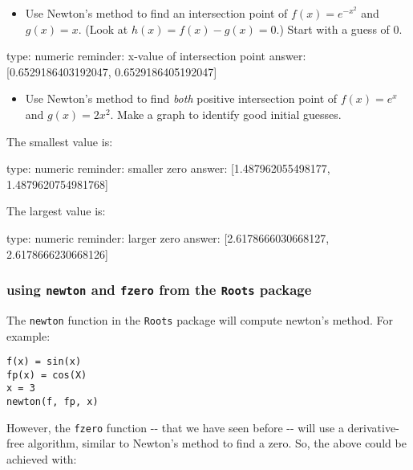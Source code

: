 \documentclass[12pt]{article}
\begin{document}
\begin{itemize}
\itemsep1pt\parskip0pt
\item
  Use Newton's method to find an intersection point of
  $f(x) =   e^{-x^2}$ and $g(x)=x$. (Look at $h(x) = f(x) - g(x) = 0$.)
  Start with a guess of $0$.
\end{itemize}

\begin{answer}
    type: numeric
    reminder: x-value of intersection point
    answer: [0.6529186403192047, 0.6529186405192047]

\end{answer}

\begin{itemize}
\itemsep1pt\parskip0pt
\item
  Use Newton's method to find \emph{both} positive intersection point of
  $f(x) = e^x$ and $g(x) = 2x^2$. Make a graph to identify good initial
  guesses.
\end{itemize}

The smallest value is:

\begin{answer}
    type: numeric
    reminder: smaller zero
    answer: [1.487962055498177, 1.4879620754981768]

\end{answer}

The largest value is:

\begin{answer}
    type: numeric
    reminder: larger zero
    answer: [2.6178666030668127, 2.6178666230668126]

\end{answer}

\subsubsection{using \texttt{newton} and \texttt{fzero} from the
\texttt{Roots} package}

The \texttt{newton} function in the \texttt{Roots} package will compute
newton's method. For example:



\begin{verbatim}
f(x) = sin(x)
fp(x) = cos(X)
x = 3
newton(f, fp, x)
\end{verbatim}
However, the \texttt{fzero} function -{}- that we have seen before -{}-
will use a derivative-free algorithm, similar to Newton's method to find
a zero. So, the above could be achieved with:
\end{document}
